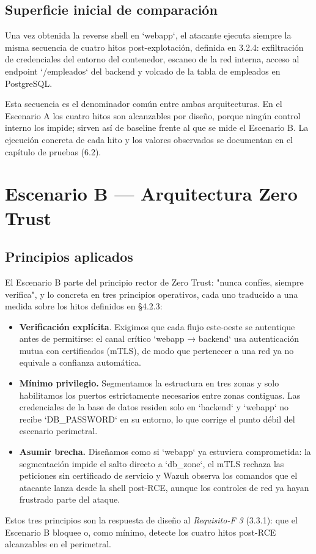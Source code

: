 \documentclass[11pt,spanish,listoffigures,listoftables]{tfgetsinf}
\begin{document}
        \subsection{Superficie inicial de comparación}
        Una vez obtenida la reverse shell en `webapp`, el atacante ejecuta siempre la misma secuencia de cuatro hitos post-explotación, definida en 3.2.4: exfiltración de credenciales del entorno del contenedor, escaneo de la red interna, acceso al endpoint `/empleados` del backend y volcado de la tabla de empleados en PostgreSQL.
        
        Esta secuencia es el denominador común entre ambas arquitecturas. En el Escenario A los cuatro hitos son alcanzables por diseño, porque ningún control interno los impide; sirven así de baseline frente al que se mide el Escenario B. La ejecución concreta de cada hito y los valores observados se documentan en el capítulo de pruebas (6.2).

    \section{Escenario B — Arquitectura Zero Trust}
        \subsection{Principios aplicados}
        El Escenario B parte del principio rector de Zero Trust: "nunca confíes, siempre verifica", y lo concreta en tres principios operativos, cada uno traducido a una medida sobre los hitos definidos en §4.2.3:
        \begin{itemize}
            \item \textbf{Verificación explícita}. Exigimos que cada flujo este-oeste se autentique antes de permitirse: el canal crítico `webapp → backend` usa autenticación mutua con certificados (mTLS), de modo que pertenecer a una red ya no equivale a confianza automática.
            \item \textbf{Mínimo privilegio.} Segmentamos la estructura en tres zonas y solo habilitamos los puertos estrictamente necesarios entre zonas contiguas. Las credenciales de la base de datos residen solo en `backend` y `webapp` no recibe `DB\_PASSWORD` en su entorno, lo que corrige el punto débil del escenario perimetral.
            \item \textbf{Asumir brecha.} Diseñamos como si `webapp` ya estuviera comprometida: la segmentación impide el salto directo a `db\_zone`, el mTLS rechaza las peticiones sin certificado de servicio y Wazuh observa los comandos que el atacante lanza desde la shell post-RCE, aunque los controles de red ya hayan frustrado parte del ataque.
        \end{itemize}
        Estos tres principios son la respuesta de diseño al\textit{ Requisito-F 3} (3.3.1): que el Escenario B bloquee o, como mínimo, detecte los cuatro hitos post-RCE alcanzables en el perimetral.
        
\end{document}
